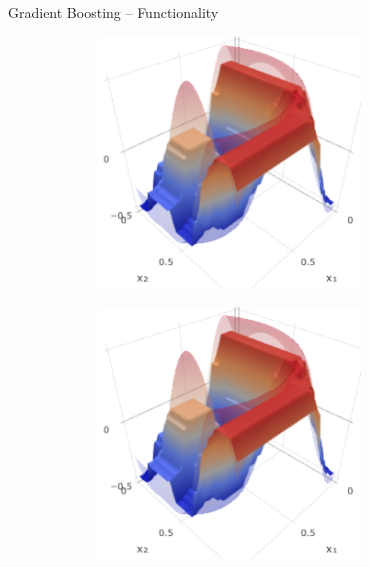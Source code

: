 \documentclass[11pt,compress,t,notes=noshow, xcolor=table]{beamer}
\begin{document}
\begin{frame}{Gradient Boosting -- Functionality}
\begin{minipage}{0.5\textwidth}
  \includegraphics[width=0.7\textwidth]{figure/gb_3d.PNG}
\end{minipage}%
\begin{minipage}{0.5\textwidth}
  \includegraphics[width=0.7\textwidth]{figure/gb_3d.PNG}
\end{minipage}

\end{frame}

\end{document}
